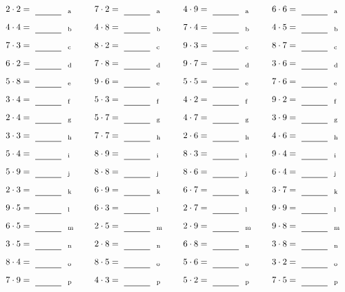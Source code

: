 \documentclass
[
  draft    = true,
  fontsize = 11pt,
  parskip  = half-
]
{scrartcl}
\begin{document}
\par\vfill\par
\begin{align*}
    \pline{2\cdot2}&=\rline{a}
  & \pline{7\cdot2}&=\rline{a}
  & \pline{4\cdot9}&=\rline{a}
  & \pline{6\cdot6}&=\rline{a} \\[1ex]
    \pline{4\cdot4}&=\rline{b}
  & \pline{4\cdot8}&=\rline{b}
  & \pline{7\cdot4}&=\rline{b}
  & \pline{4\cdot5}&=\rline{b} \\[1ex]
    \pline{7\cdot3}&=\rline{c}
  & \pline{8\cdot2}&=\rline{c}
  & \pline{9\cdot3}&=\rline{c}
  & \pline{8\cdot7}&=\rline{c} \\[1ex]
    \pline{6\cdot2}&=\rline{d}
  & \pline{7\cdot8}&=\rline{d}
  & \pline{9\cdot7}&=\rline{d}
  & \pline{3\cdot6}&=\rline{d} \\[1ex]
    \pline{5\cdot8}&=\rline{e}
  & \pline{9\cdot6}&=\rline{e}
  & \pline{5\cdot5}&=\rline{e}
  & \pline{7\cdot6}&=\rline{e} \\[1ex]
    \pline{3\cdot4}&=\rline{f}
  & \pline{5\cdot3}&=\rline{f}
  & \pline{4\cdot2}&=\rline{f}
  & \pline{9\cdot2}&=\rline{f} \\[1ex]
    \pline{2\cdot4}&=\rline{g}
  & \pline{5\cdot7}&=\rline{g}
  & \pline{4\cdot7}&=\rline{g}
  & \pline{3\cdot9}&=\rline{g} \\[1ex]
    \pline{3\cdot3}&=\rline{h}
  & \pline{7\cdot7}&=\rline{h}
  & \pline{2\cdot6}&=\rline{h}
  & \pline{4\cdot6}&=\rline{h} \\[1ex]
    \pline{5\cdot4}&=\rline{i}
  & \pline{8\cdot9}&=\rline{i}
  & \pline{8\cdot3}&=\rline{i}
  & \pline{9\cdot4}&=\rline{i} \\[1ex]
    \pline{5\cdot9}&=\rline{j}
  & \pline{8\cdot8}&=\rline{j}
  & \pline{8\cdot6}&=\rline{j}
  & \pline{6\cdot4}&=\rline{j} \\[1ex]
    \pline{2\cdot3}&=\rline{k}
  & \pline{6\cdot9}&=\rline{k}
  & \pline{6\cdot7}&=\rline{k}
  & \pline{3\cdot7}&=\rline{k} \\[1ex]
    \pline{9\cdot5}&=\rline{l}
  & \pline{6\cdot3}&=\rline{l}
  & \pline{2\cdot7}&=\rline{l}
  & \pline{9\cdot9}&=\rline{l} \\[1ex]
    \pline{6\cdot5}&=\rline{m}
  & \pline{2\cdot5}&=\rline{m}
  & \pline{2\cdot9}&=\rline{m}
  & \pline{9\cdot8}&=\rline{m} \\[1ex]
    \pline{3\cdot5}&=\rline{n}
  & \pline{2\cdot8}&=\rline{n}
  & \pline{6\cdot8}&=\rline{n}
  & \pline{3\cdot8}&=\rline{n} \\[1ex]
    \pline{8\cdot4}&=\rline{o}
  & \pline{8\cdot5}&=\rline{o}
  & \pline{5\cdot6}&=\rline{o}
  & \pline{3\cdot2}&=\rline{o} \\[1ex]
    \pline{7\cdot9}&=\rline{p}
  & \pline{4\cdot3}&=\rline{p}
  & \pline{5\cdot2}&=\rline{p}
  & \pline{7\cdot5}&=\rline{p}
\end{align*}
\end{document}
